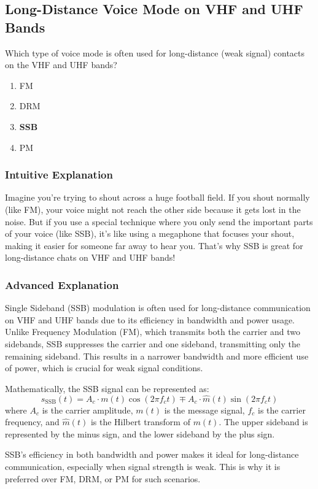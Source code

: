 \subsection{Long-Distance Voice Mode on VHF and UHF Bands}
\label{T8A03}

\begin{tcolorbox}[colback=gray!10!white,colframe=black!75!black,title=T8A03]
Which type of voice mode is often used for long-distance (weak signal) contacts on the VHF and UHF bands?
\begin{enumerate}[label=\Alph*)]
    \item FM
    \item DRM
    \item \textbf{SSB}
    \item PM
\end{enumerate}
\end{tcolorbox}

\subsubsection{Intuitive Explanation}
Imagine you're trying to shout across a huge football field. If you shout normally (like FM), your voice might not reach the other side because it gets lost in the noise. But if you use a special technique where you only send the important parts of your voice (like SSB), it’s like using a megaphone that focuses your shout, making it easier for someone far away to hear you. That’s why SSB is great for long-distance chats on VHF and UHF bands!

\subsubsection{Advanced Explanation}
Single Sideband (SSB) modulation is often used for long-distance communication on VHF and UHF bands due to its efficiency in bandwidth and power usage. Unlike Frequency Modulation (FM), which transmits both the carrier and two sidebands, SSB suppresses the carrier and one sideband, transmitting only the remaining sideband. This results in a narrower bandwidth and more efficient use of power, which is crucial for weak signal conditions.

Mathematically, the SSB signal can be represented as:
\[
s_{\text{SSB}}(t) = A_c \cdot m(t) \cos(2\pi f_c t) \mp A_c \cdot \hat{m}(t) \sin(2\pi f_c t)
\]
where \( A_c \) is the carrier amplitude, \( m(t) \) is the message signal, \( f_c \) is the carrier frequency, and \( \hat{m}(t) \) is the Hilbert transform of \( m(t) \). The upper sideband is represented by the minus sign, and the lower sideband by the plus sign.

SSB’s efficiency in both bandwidth and power makes it ideal for long-distance communication, especially when signal strength is weak. This is why it is preferred over FM, DRM, or PM for such scenarios.

